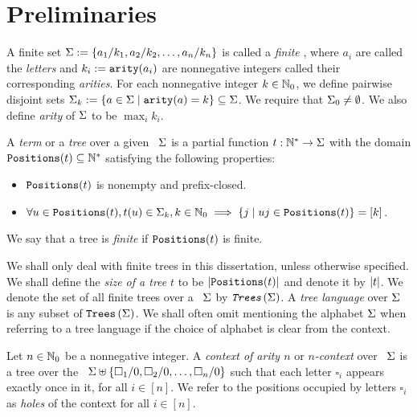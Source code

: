 \section{Preliminaries}\label{sec:preliminaries_atomicTreeTransform}

\begin{definition}\label{def:rankedAlphabet}
    A finite set $\Sigma := \left\{ a_1/k_1, a_2/k_2, \dots, a_n/k_n \right\}$ is called a \emph{finite \rab}, where $a_i$ are called the \emph{letters} and $k_i := \texttt{arity}(a_i)$ are nonnegative integers called their corresponding \emph{arities}. For each nonnegative integer $k \in \mathbb{N}_0$, we define pairwise disjoint sets $\Sigma_k := \left\{ a \in \Sigma \mid \texttt{arity}(a) = k \right\} \subseteq \Sigma$. We require that $\Sigma_0 \neq \emptyset$. We also define \emph{arity} of $\Sigma$ to be $\max_i k_i$.
\end{definition}


\begin{definition}\label{def:tree}
    A \emph{term} or a \emph{tree} over a given \rab\ $\Sigma$ is a partial function $t : \mathbb{N}^* \to \Sigma$ with the domain $\texttt{Positions}(t) \subseteq \mathbb{N}^*$ satisfying the following properties:
    \begin{itemize}
        \item $\texttt{Positions}(t)$ is nonempty and prefix-closed.
        \item $\forall u \in \texttt{Positions}(t), t(u) \in \Sigma_k, k \in \mathbb{N}_0 \implies \left\{ j \mid uj \in \texttt{Positions}(t) \right\} = [k]$. 
    \end{itemize}
    We say that a tree is \emph{finite} if $\texttt{Positions}(t)$ is finite.
\end{definition}

We shall only deal with finite trees in this dissertation, unless otherwise specified. We shall define the \emph{size of a tree} $t$ to be $\left\lvert \texttt{Positions}(t) \right\rvert$ and denote it by $\left\lvert t \right\rvert$. We denote the set of all finite trees over a \rab\ $\Sigma$ by $\emph{\ensuremath{\texttt{Trees}\left(\Sigma\right)}}$. A \emph{tree language} over $\Sigma$ is any subset of $\texttt{Trees}\left(\Sigma\right)$. We shall often omit mentioning the alphabet $\Sigma$ when referring to a tree language if the choice of alphabet is clear from the context.

\begin{definition}[Context]\label{def:context}
    Let $n \in \mathbb{N}_0$ be a nonnegative integer. A \emph{context of arity $n$} or \emph{$n$-context} over \rab\ $\Sigma$ is a tree over the \rab\ $\Sigma \uplus \left\{ \square_1/0, \square_2/0, \dots, \square_n/0 \right\}$ such that each letter $\square_i$ appears exactly once in it, for all $i \in [n]$. We refer to the positions occupied by letters $\square_i$ as \emph{holes} of the context for all $i \in [n]$.
\end{definition}


